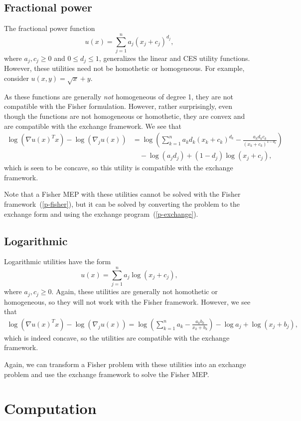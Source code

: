 \documentclass[12pt]{article}
\begin{document}
\subsection{Fractional power}
The fractional power function
\[
u(x) = \sum_{j=1}^n a_j (x_j+ c_j)^{d_j},
\]
where $a_j, c_j \geq 0$ and $0 \leq d_j \leq 1$,
generalizes the linear and CES utility functions.
However, these utilities need not be homothetic or homogeneous.
For example, consider $u(x,y) = \sqrt{x} + y$.

As these functions are generally \emph{not} homogeneous of degree 1,
they are not compatible with the Fisher formulation.
However, rather surprisingly, even though the
functions are not homogeneous or homothetic, they are
convex and are compatible with the exchange framework.
We see that
\begin{align*}
\log(\nabla u(x)^T x) - \log(\nabla_j u(x))
&= \log\left(\sum_{k=1}^n a_k d_k (x_k+c_k)^{d_k} - \frac{a_k d_k c_k}{(x_k + c_k)^{1-d_k}} \right)\\
&\quad- \log(a_j d_j) + (1-d_j)\log (x_j + c_j),
\end{align*}
which is seen to be concave, so this utility is compatible with
the exchange framework.

Note that a Fisher MEP with these utilities cannot
be solved with the Fisher framework~(\ref{p-fisher}),
but it can be solved by converting the
problem to the exchange form and using the exchange program~(\ref{p-exchange}).


\subsection{Logarithmic}
Logarithmic utilities have the form
\[
u(x) = \sum_{j=1}^n a_j \log(x_j+ c_j),
\]
where $a_j, c_j \geq 0$.
Again, these utilities are generally not homothetic or
homogeneous, so they will not work with the Fisher framework.
However, we see that 
\begin{align*}
\log(\nabla u(x)^T x) - \log(\nabla_j u(x)) =
\log\left(\sum_{k=1}^n a_k - \frac{a_k b_k}{x_k+b_k} \right) - \log a_j + \log (x_j + b_j),
\end{align*}
which is indeed concave, so the utilities are compatible
with the exchange framework.

Again, we can transform a Fisher problem with these utilities into
an exchange problem and use the exchange framework to solve
the Fisher MEP.

\section{Computation}
\label{sec:computation}
\end{document}
